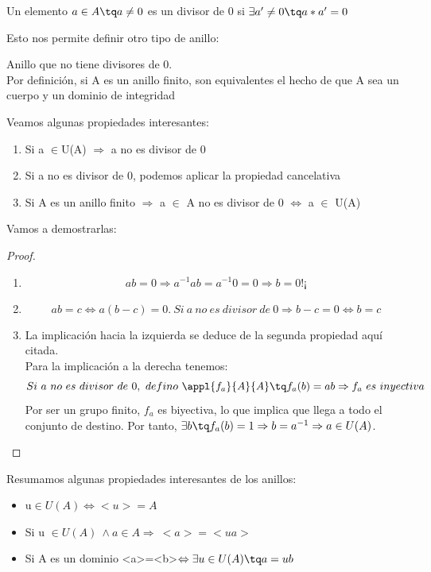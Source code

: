\documentclass[nochap]{apuntes}
\begin{document}
\begin{defn}[Divisor de 0]
 Un elemento $a\in A \tq a\neq 0$  es un divisor de 0 si $\exists a'\neq 0 \tq a*a'=0$
\end{defn}

Esto nos permite definir otro tipo de anillo:
\begin{defn}
 Anillo que no tiene divisores de 0.\\
 Por definición, si A es un anillo finito, son equivalentes el hecho de que A sea un cuerpo y un dominio de integridad
\end{defn}

Veamos algunas propiedades interesantes:
\begin{enumerate}
 \item Si a $\in$U(A) $ \Rightarrow$  a no es divisor de 0
 \item Si a no es divisor de 0, podemos aplicar la propiedad cancelativa
 \item Si A es un anillo finito $\Rightarrow$  a $\in$ A no es divisor de 0 $\Leftrightarrow$  a $\in$ U(A)
\end{enumerate}

Vamos a demostrarlas:
\begin{proof}
 \begin{enumerate}
  \item \[ab=0 \Rightarrow a^{-1}ab=a^{-1}0=0 \Rightarrow b=0 !¡\]
  \item \[ab=c \Leftrightarrow a(b-c)=0. \ Si \ a \ no \ es \ divisor \ de \ 0 \Rightarrow b-c=0 \Leftrightarrow b=c\]
  \item La implicación hacia la izquierda se deduce de la segunda propiedad aquí citada.\\
  Para la implicación a la derecha tenemos:
  \[Si \ a \ no \ es \ divisor \ de \ 0, \ defino\ \appl{f_a}{A}{A} \tq f_a(b)=ab \Rightarrow f_a \ es \ inyectiva\]
  Por ser un grupo finito, $f_a$  es biyectiva, lo que implica que llega a todo el conjunto de destino. Por tanto, $\exists b \tq f_a(b)=1 \Rightarrow b=a^{-1}
  \Rightarrow a \in U(A)$.
 \end{enumerate}

\end{proof}

Resumamos algunas propiedades interesantes de los anillos:
\begin{itemize}
 \item u$\in U(A) \Leftrightarrow <u> = A$
 \item Si u $\in U(A) \ \wedge a \in A \Rightarrow \ <a>=<ua>$
 \item Si A es un dominio <a>=<b>$\Leftrightarrow \exists u \in U(A) \tq a=ub$
\end{itemize}
\end{document}
